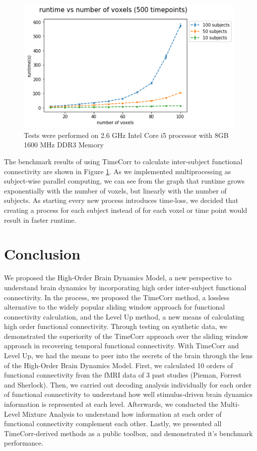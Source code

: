 \documentclass[11pt]{article}
\begin{document}
\begin{figure}[!htb]
\centering
\includegraphics[width=1\textwidth]{../figures/Benchmark/500timepoints.png}
Tests were performed on 2.6 GHz Intel Core i5 processor with 8GB 1600 MHz DDR3 Memory
\label{fig:benchmark}
\end{figure}

The benchmark results of using TimeCorr to calculate inter-subject functional connectivity are shown in Figure \ref{fig:benchmark}. As we implemented multiprocessing as subject-wise parallel computing, we can see from the graph that runtime grows exponentially with the number of voxels, but linearly with the number of subjects. As starting every new process introduces time-loss, we decided that creating a process for each subject instead of for each voxel or time point would result in faster runtime.

\newpage
\section{Conclusion}
We proposed the High-Order Brain Dynamics Model, a new perspective to understand brain dynamics by incorporating high order inter-subject functional connectivity. In the process, we proposed the TimeCorr method, a lossless alternative to the widely popular sliding window approach for functional connectivity calculation, and the Level Up method, a new means of calculating high order functional connectivity. Through testing on synthetic data, we demonstrated the superiority of the TimeCorr approach over the sliding window approach in recovering temporal functional connectivity. With TimeCorr and Level Up, we had the means to peer into the secrets of the brain through the lens of the High-Order Brain Dynamics Model. First, we calculated 10 orders of functional connectivity from the fMRI data of 3 past studies (Pieman, Forrest and Sherlock). Then, we carried out decoding analysis individually for each order of functional connectivity to understand how well stimulus-driven brain dynamics information is represented at each level. Afterwards, we conducted the Multi-Level Mixture Analysis to understand how information at each order of functional connectivity complement each other. Lastly, we presented all TimeCorr-derived methods as a public toolbox, and demonstrated it's benchmark performance.
\end{document}
